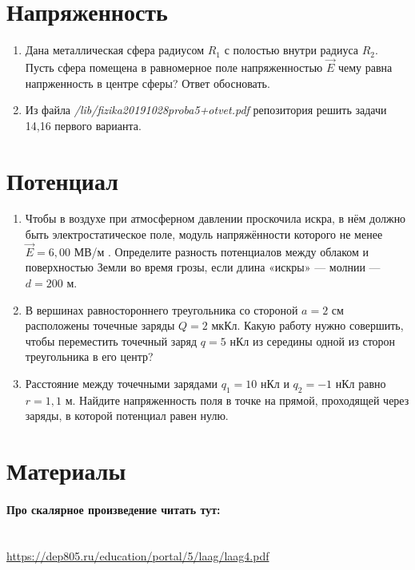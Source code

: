 \documentclass[a4paper,12pt]{article} %
\begin{document}
\section{Напряженность}
\begin{enumerate}


	\item Дана металлическая сфера радиусом $ R_1 $ с полостью внутри радиуса $ R_2 $. Пусть сфера помещена в равномерное поле напряженностью $ \vec{E} $ чему равна напрженность в центре сферы? Ответ обосновать.


	\item Из файла \textit{/lib/fizika20191028proba5+otvet.pdf}  репозитория решить задачи 14,16 первого варианта. 

\end{enumerate}



\section{Потенциал}
\begin{enumerate}


\item Чтобы в воздухе при атмосферном давлении проскочила искра, в нём должно быть электростатическое поле, модуль напряжённости которого не менее $ \vec{E} = 6,00 $ МВ/м . Определите разность потенциалов между облаком и поверхностью Земли во время грозы, если длина «искры» — молнии — $ d=200 $ м.

\item В вершинах равностороннего треугольника со стороной $ a=2 $ см расположены точечные заряды $  Q=2 $ мкКл. Какую работу нужно совершить, чтобы переместить точечный заряд  $ q=5 $ нКл из середины одной из сторон треугольника в его центр?

\item Расстояние между точечными зарядами $ q_1=10 $ нКл и  $ q_2=-1 $ нКл равно $r=1,1$ м. Найдите напряженность поля в точке на прямой, проходящей через заряды, в которой потенциал равен нулю.

\end{enumerate}



\section{Материалы}

\paragraph{Про скалярное произведение читать тут:}\\ 
\url{https://dep805.ru/education/portal/5/laag/laag4.pdf}
\end{document}
